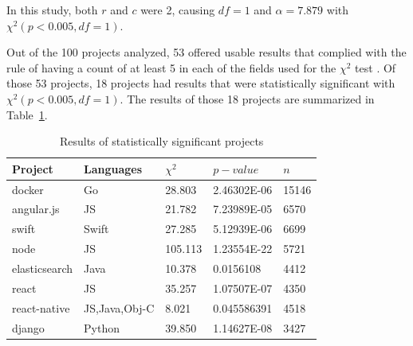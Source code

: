 In this study, both $r$ and $c$ were 2, causing $df = 1$ and $\alpha = 7.879$ with $\chi^2(p<0.005, df=1)$.

Out of the 100 projects analyzed, 53 offered usable results that complied with the rule of having a count of at least 5 in each of the fields used for the $\chi^2$ test \cite[p.104]{chi2016springer}. Of those 53 projects, 18 projects had results that were statistically significant with $\chi^2(p<0.005, df=1)$. The results of those 18 projects are summarized in Table~\ref{table:results}.


\begin{table}[!t]
         \renewcommand{\arraystretch}{1.3}
         \caption{Results of statistically significant projects}
         \label{table:results}
         \centering

         \begin{tabular} {  l | l | l | l | l}
		 \textbf{Project}        &       \textbf{Languages}             &       $\chi^2$        &       $p-value$                       &       $n$             \\ \hline
                 docker                  &       Go                             &       28.803                  &       2.46302E-06             &       15146           \\
                 angular.js              &       \ac{JS}                     	&       21.782                  &       7.23989E-05             &       6570            \\
                 swift                   &       Swift                          &       27.285                  &       5.12939E-06             &       6699            \\
                 node                    &       \ac{JS}			&       105.113                 &       1.23554E-22             &       5721            \\
                 elasticsearch           &       Java                           &       10.378                  &       0.0156108               &       4412            \\
                 react                   &       \ac{JS}                      	&       35.257                  &       1.07507E-07             &       4350            \\
                 react-native            &       \ac{JS},Java,Obj-C     	&       8.021                   &       0.045586391             &       4518            \\
                 django                  &       Python                         &       39.850                  &       1.14627E-08             &       3427            \\

\end{tabular}
\end{table}
